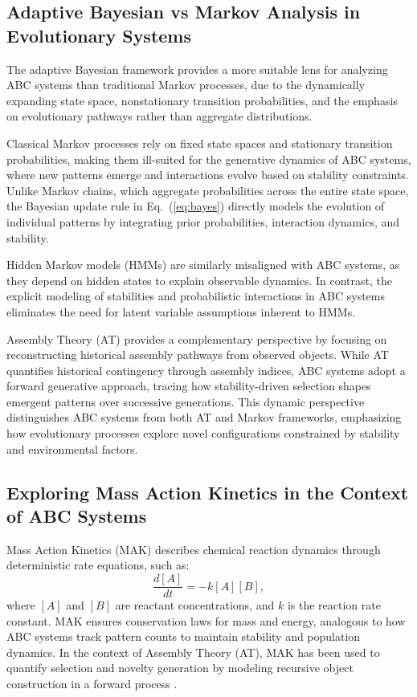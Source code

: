 \documentclass[entropy,article,submit,pdftex,oneauthor]{Definitions/mdpi}
\begin{document}
\subsection{Adaptive Bayesian vs Markov Analysis in Evolutionary Systems}

The adaptive Bayesian framework provides a more suitable lens for analyzing ABC systems than traditional Markov processes, due to the dynamically expanding state space, nonstationary transition probabilities, and the emphasis on evolutionary pathways rather than aggregate distributions. 

Classical Markov processes \cite{norris1997markov} rely on fixed state spaces and stationary transition probabilities, making them ill-suited for the generative dynamics of ABC systems, where new patterns emerge and interactions evolve based on stability constraints. Unlike Markov chains, which aggregate probabilities across the entire state space, the Bayesian update rule in Eq.~(\ref{eq:bayes}) directly models the evolution of individual patterns by integrating prior probabilities, interaction dynamics, and stability.

Hidden Markov models (HMMs) \cite{rabiner1989hmm} are similarly misaligned with ABC systems, as they depend on hidden states to explain observable dynamics. In contrast, the explicit modeling of stabilities and probabilistic interactions in ABC systems eliminates the need for latent variable assumptions inherent to HMMs.

Assembly Theory (AT) provides a complementary perspective by focusing on reconstructing historical assembly pathways from observed objects. While AT quantifies historical contingency through assembly indices, ABC systems adopt a forward generative approach, tracing how stability-driven selection shapes emergent patterns over successive generations. This dynamic perspective distinguishes ABC systems from both AT and Markov frameworks, emphasizing how evolutionary processes explore novel configurations constrained by stability and environmental factors.

\subsection{Exploring Mass Action Kinetics in the Context of ABC Systems}

Mass Action Kinetics (MAK) \cite{TuranyiTomlin2014} describes chemical reaction dynamics through deterministic rate equations, such as:
\begin{equation}
\frac{d[A]}{dt} = -k[A][B],
\end{equation}
where \( [A] \) and \( [B] \) are reactant concentrations, and \( k \) is the reaction rate constant. MAK ensures conservation laws for mass and energy, analogous to how ABC systems track pattern counts to maintain stability and population dynamics. In the context of Assembly Theory (AT), MAK has been used to quantify selection and novelty generation by modeling recursive object construction in a forward process \cite{walker2023nature}.
\end{document}
